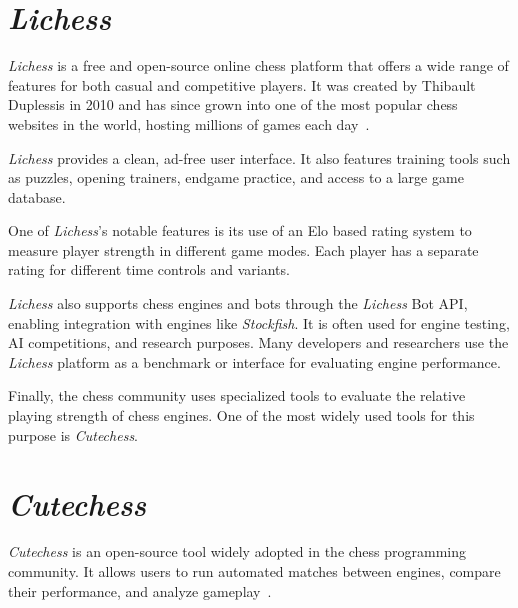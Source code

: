 \section{\textit{Lichess}}
\label{sec:lichess}

\textit{Lichess} is a free and open-source online chess platform that offers a wide range of features for both casual and competitive players. It was created by Thibault Duplessis in 2010 and has since grown into one of the most popular chess websites in the world, hosting millions of games each day~\cite{Lichess}.

\vspace{1em}

\noindent \textit{Lichess} provides a clean, ad-free user interface. It also features training tools such as puzzles, opening trainers, endgame practice, and access to a large game database.

\vspace{1em}

\noindent One of \textit{Lichess}'s notable features is its use of an Elo based rating system to measure player strength in different game modes. Each player has a separate rating for different time controls and variants.

\vspace{1em}

\noindent \textit{Lichess} also supports chess engines and bots through the \textit{Lichess} Bot API, enabling integration with engines like \textit{Stockfish}. It is often used for engine testing, AI competitions, and research purposes. Many developers and researchers use the \textit{Lichess} platform as a benchmark or interface for evaluating engine performance.

\vspace{2em}

Finally, the chess community uses specialized tools to evaluate the relative playing strength of chess engines. One of the most widely used tools for this purpose is \textit{Cutechess}.

\section{\textit{Cutechess}}
\label{sec:cutechess}

\noindent \textit{Cutechess} is an open-source tool widely adopted in the chess programming community. It allows users to run automated matches between engines, compare their performance, and analyze gameplay~\cite{CuteChess}.

